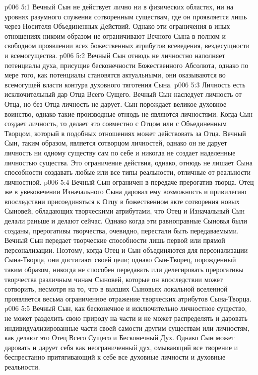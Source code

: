 \vs p006 5:1 Вечный Сын не действует лично ни в физических областях, ни на уровнях разумного служения сотворенным существам, где он проявляется лишь через Носителя Объединенных Действий. Однако эти ограничения в иных отношениях никоим образом не ограничивают Вечного Сына в полном и свободном проявлении всех божественных атрибутов  всеведения, вездесущности и всемогущества.
\vs p006 5:2 Вечный Сын отнюдь не личностно наполняет потенциалы духа, присущие бесконечности Божественного Абсолюта, однако по мере того, как потенциалы становятся актуальными, они оказываются во всемогущей власти контура духовного тяготения Сына.
\vs p006 5:3 Личность есть исключительный дар Отца Всего Сущего. Вечный Сын наследует личность от Отца, но без Отца личность не дарует. Сын порождает великое духовное воинство, однако такие производные отнюдь не являются личностями. Когда Сын создает личность, то делает это совместно с Отцом или с Объединенным Творцом, который в подобных отношениях может действовать за Отца. Вечный Сын, таким образом, является сотворцом личностей, однако он не дарует личность ни одному существу сам по себе и никогда не создает наделенные личностью существа. Это ограничение действия, однако, отнюдь не лишает Сына способности создавать любые или все типы реальности, отличные от реальности личностной.
\vs p006 5:4 Вечный Сын ограничен в передаче прерогатив творца. Отец же в увековечении Изначального Сына даровал ему возможность и привилегию впоследствии присоединяться к Отцу в божественном акте сотворения новых Сыновей, обладающих творческими атрибутами, что Отец и Изначальный Сын делали раньше и делают сейчас. Однако когда эти равноправные Сыновья были созданы, прерогативы творчества, очевидно, перестали быть передаваемыми. Вечный Сын передает творческие способности лишь первой или прямой персонализации. Поэтому, когда Отец и Сын объединяются для персонализации Сына\hyp{}Творца, они достигают своей цели; однако Сын\hyp{}Творец, порожденный таким образом, никогда не способен передавать или делегировать прерогативы творчества различным чинам Сыновей, которые он впоследствии может сотворить, несмотря на то, что в высших Сыновьях локальной вселенной проявляется весьма ограниченное отражение творческих атрибутов Сына\hyp{}Творца.
\vs p006 5:5 Вечный Сын, как бесконечное и исключительно личностное существо, не может разделить свою природу на части и не может распределять и даровать индивидуализированные части своей самости другим существам или личностям, как делают это Отец Всего Сущего и Бесконечный Дух. Однако Сын может даровать и дарует себя как неограниченный дух, омывающий все творение и беспрестанно притягивающий к себе все духовные личности и духовные реальности.
